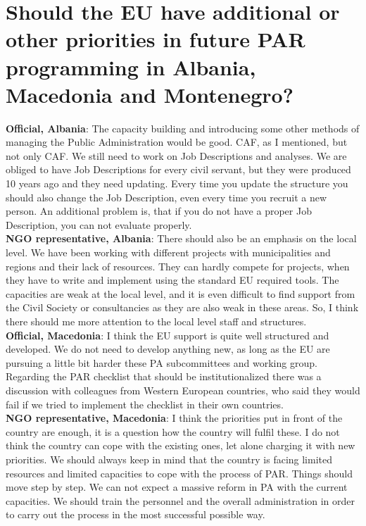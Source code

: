 \section{Should the EU have additional or other priorities in future PAR programming in Albania, Macedonia and Montenegro?}
\label{sec:par priorities}
\textbf{Official, Albania}: The capacity building and introducing some other methods of managing the Public Administration would be good. CAF, as I mentioned, but not only CAF. We still need to work on Job Descriptions and analyses. We are obliged to have Job Descriptions for every civil servant, but they were produced 10 years ago and they need updating. Every time you update the structure you should also change the Job Description, even every time you recruit a new person. An additional problem is, that if you do not have a proper Job Description, you can not evaluate properly. \\
\textbf{NGO representative, Albania}: There should also be an emphasis on the local level. We have been working with different projects with municipalities and regions and their lack of resources. They can hardly compete for projects, when they have to write and implement using the standard EU required tools. The capacities are weak at the local level, and it is even difficult to find support from the Civil Society or consultancies as they are also weak in these areas. So, I think there should me more attention to the local level staff and structures. \\
\textbf{Official, Macedonia}: I think the EU support is quite well structured and developed. We do not need to develop anything new, as long as the EU are pursuing a little bit harder these PA subcommittees and working group. Regarding the PAR checklist that should be institutionalized there was a discussion with colleagues from Western European countries, who said they would fail if we tried to implement the checklist in their own countries. \\
\textbf{NGO representative, Macedonia}: I think the priorities put in front of the country are enough, it is a question how the country will fulfil these. I do not think the country can cope with the existing ones, let alone charging it with new priorities. We should always keep in mind that the country is facing limited resources and limited capacities to cope with the process of PAR. Things should move step by step. We can not expect a massive reform in PA with the current capacities. We should train the personnel and the overall administration in order to carry out the process in the most successful possible way. \\
